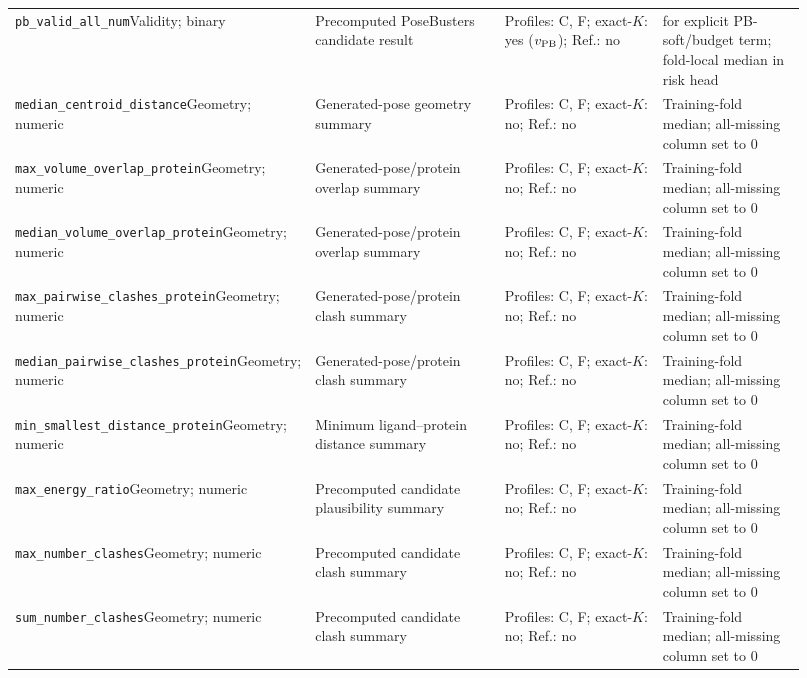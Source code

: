 \begin{longtable}{@{}>{\raggedright\arraybackslash}p{0.22\linewidth}>{\raggedright\arraybackslash}p{0.27\linewidth}>{\raggedright\arraybackslash}p{0.23\linewidth}>{\raggedright\arraybackslash}p{0.20\linewidth}@{}}
\texttt{pb_valid_all_num}\newline Validity; binary & Precomputed PoseBusters candidate result & Profiles: C, F; exact-$K$: yes ($v_{\rm PB}$); Ref.: no & 0 for explicit PB-soft/budget term; fold-local median in risk head\\
\texttt{median_centroid_distance}\newline Geometry; numeric & Generated-pose geometry summary & Profiles: C, F; exact-$K$: no; Ref.: no & Training-fold median; all-missing column set to 0\\
\texttt{max_volume_overlap_protein}\newline Geometry; numeric & Generated-pose/protein overlap summary & Profiles: C, F; exact-$K$: no; Ref.: no & Training-fold median; all-missing column set to 0\\
\texttt{median_volume_overlap_protein}\newline Geometry; numeric & Generated-pose/protein overlap summary & Profiles: C, F; exact-$K$: no; Ref.: no & Training-fold median; all-missing column set to 0\\
\texttt{max_pairwise_clashes_protein}\newline Geometry; numeric & Generated-pose/protein clash summary & Profiles: C, F; exact-$K$: no; Ref.: no & Training-fold median; all-missing column set to 0\\
\texttt{median_pairwise_clashes_protein}\newline Geometry; numeric & Generated-pose/protein clash summary & Profiles: C, F; exact-$K$: no; Ref.: no & Training-fold median; all-missing column set to 0\\
\texttt{min_smallest_distance_protein}\newline Geometry; numeric & Minimum ligand--protein distance summary & Profiles: C, F; exact-$K$: no; Ref.: no & Training-fold median; all-missing column set to 0\\
\texttt{max_energy_ratio}\newline Geometry; numeric & Precomputed candidate plausibility summary & Profiles: C, F; exact-$K$: no; Ref.: no & Training-fold median; all-missing column set to 0\\
\texttt{max_number_clashes}\newline Geometry; numeric & Precomputed candidate clash summary & Profiles: C, F; exact-$K$: no; Ref.: no & Training-fold median; all-missing column set to 0\\
\texttt{sum_number_clashes}\newline Geometry; numeric & Precomputed candidate clash summary & Profiles: C, F; exact-$K$: no; Ref.: no & Training-fold median; all-missing column set to 0\\

\end{longtable}
